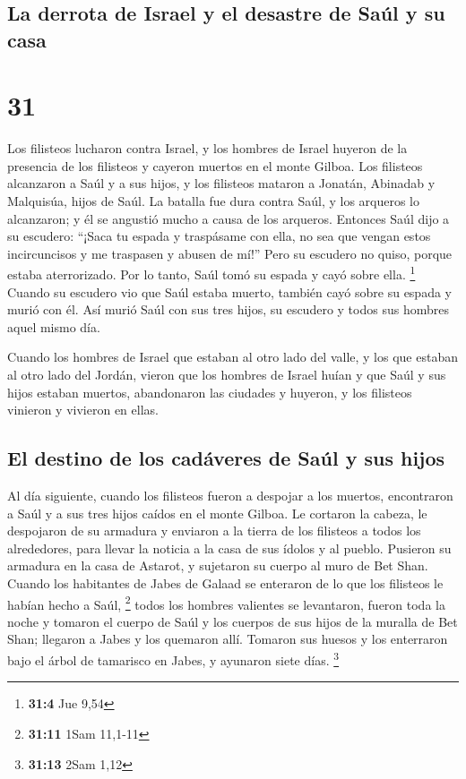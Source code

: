 \hypertarget{la-derrota-de-israel-y-el-desastre-de-sauxfal-y-su-casa}{%
\subsection{La derrota de Israel y el desastre de Saúl y su
casa}\label{la-derrota-de-israel-y-el-desastre-de-sauxfal-y-su-casa}}

\hypertarget{section-30}{%
\section{31}\label{section-30}}

 Los filisteos lucharon contra Israel, y los hombres de
Israel huyeron de la presencia de los filisteos y cayeron muertos en el
monte Gilboa.  Los filisteos alcanzaron a Saúl y a sus
hijos, y los filisteos mataron a Jonatán, Abinadab y Malquisúa, hijos de
Saúl.  La batalla fue dura contra Saúl, y los arqueros lo
alcanzaron; y él se angustió mucho a causa de los arqueros.
 Entonces Saúl dijo a su escudero: ``¡Saca tu espada y
traspásame con ella, no sea que vengan estos incircuncisos y me
traspasen y abusen de mí!'' Pero su escudero no quiso, porque estaba
aterrorizado. Por lo tanto, Saúl tomó su espada y cayó sobre ella.
\footnote{\textbf{31:4} Jue 9,54}  Cuando su escudero vio
que Saúl estaba muerto, también cayó sobre su espada y murió con él.
 Así murió Saúl con sus tres hijos, su escudero y todos
sus hombres aquel mismo día.

 Cuando los hombres de Israel que estaban al otro lado del
valle, y los que estaban al otro lado del Jordán, vieron que los hombres
de Israel huían y que Saúl y sus hijos estaban muertos, abandonaron las
ciudades y huyeron, y los filisteos vinieron y vivieron en ellas.

\hypertarget{el-destino-de-los-caduxe1veres-de-sauxfal-y-sus-hijos}{%
\subsection{El destino de los cadáveres de Saúl y sus
hijos}\label{el-destino-de-los-caduxe1veres-de-sauxfal-y-sus-hijos}}

 Al día siguiente, cuando los filisteos fueron a despojar
a los muertos, encontraron a Saúl y a sus tres hijos caídos en el monte
Gilboa.  Le cortaron la cabeza, le despojaron de su
armadura y enviaron a la tierra de los filisteos a todos los
alrededores, para llevar la noticia a la casa de sus ídolos y al pueblo.
 Pusieron su armadura en la casa de Astarot, y sujetaron
su cuerpo al muro de Bet Shan.  Cuando los habitantes de
Jabes de Galaad se enteraron de lo que los filisteos le habían hecho a
Saúl, \footnote{\textbf{31:11} 1Sam 11,1-11}  todos los
hombres valientes se levantaron, fueron toda la noche y tomaron el
cuerpo de Saúl y los cuerpos de sus hijos de la muralla de Bet Shan;
llegaron a Jabes y los quemaron allí.  Tomaron sus huesos
y los enterraron bajo el árbol de tamarisco en Jabes, y ayunaron siete
días. \footnote{\textbf{31:13} 2Sam 1,12}
